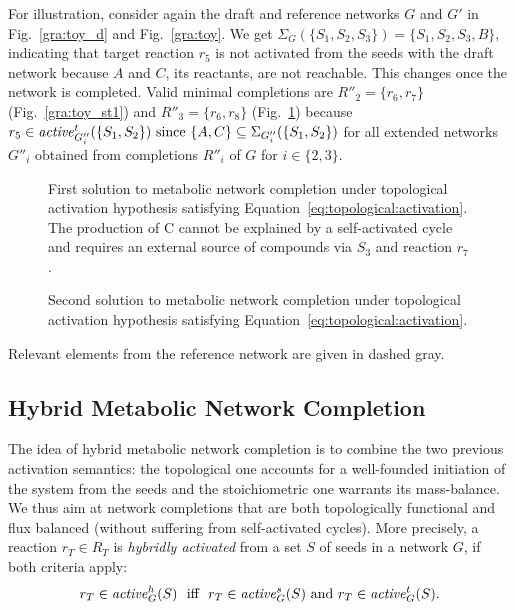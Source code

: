 For illustration, consider again the draft and reference networks $G$ and $G'$ in Fig.~\ref{gra:toy_d} and Fig.~\ref{gra:toy}.
%
We get $\Sigma_{G}(\{S_1,S_2,S_3\})=\{S_1,S_2,S_3,B\}$, indicating that target reaction $r_5$ is not activated from the seeds with the draft network
because $A$ and $C$, its reactants, are not reachable.
%
This changes once the network is completed.
%
Valid minimal completions are $R''_2=\{r_6,r_7\}$ (Fig.~\ref{gra:toy_st1}) and $R''_3=\{r_6,r_8\}$ (Fig.~\ref{gra:toy_st2}) because
\(
r_5\in\mathit{active}^{t}_{G''_i}(\{S_1,S_2\})\mbox{ since }\{A,C\}\subseteq\Sigma_{G''_i}(\{S_1,S_2\})
\)
for all extended networks $G''_i$ obtained from completions $R''_i$ of $G$ for $i\in\{2,3\}$.
%
\begin{figure}
    \captionsetup{width=0.45\textwidth}
    \centering
    \begin{minipage}[t]{.5\textwidth}
      \centering
      
      \caption{First solution to metabolic network completion under topological activation hypothesis satisfying Equation~\eqref{eq:topological:activation}. The production of C cannot be explained by a self-activated cycle and requires an external source of compounds via $S_3$ and reaction $r_7$.}
      \label{gra:toy_st1}
    \end{minipage}%
    \begin{minipage}[t]{.5\textwidth}
      \centering
      
      \caption{Second solution to metabolic network completion under topological activation hypothesis satisfying Equation~\eqref{eq:topological:activation}.}
      \label{gra:toy_st2}
    \end{minipage}
\end{figure}

Relevant elements from the reference network are given in dashed gray.

\subsection{Hybrid Metabolic Network Completion}\label{sec:hybrid} %
%
The idea of hybrid metabolic network completion is to combine the two previous activation semantics:
the topological one accounts for a well-founded initiation of the system from the seeds
and the stoichiometric one warrants its mass-balance.
%
We thus aim at network completions that are both topologically functional and flux balanced
(without suffering from self-activated cycles).
%
More precisely,
a reaction $r_T\in R_T$ is \emph{hybridly activated} from a set $S$ of seeds in a network $G$,
if both criteria apply:
%
\begin{align}%
\label{eq:hybrid:activation}
r_T \in \Activity{h}{G}{S} \ \text{ iff } \ r_T \in \Activity{s}{G}{S}\text{ and }r_T \in \Activity{t}{G}{S}.
\end{align}%

